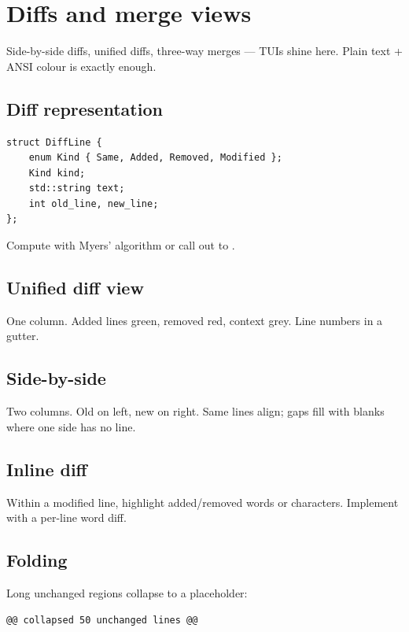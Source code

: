 \chapter{Diffs and merge views}
\label{ch:diffview}

\begin{aside}
Side-by-side diffs, unified diffs, three-way merges --- TUIs
shine here. Plain text + ANSI colour is exactly enough.
\end{aside}

\section{Diff representation}

\begin{lstlisting}
struct DiffLine {
    enum Kind { Same, Added, Removed, Modified };
    Kind kind;
    std::string text;
    int old_line, new_line;
};
\end{lstlisting}

Compute with Myers' algorithm or call out to .

\section{Unified diff view}

One column. Added lines green, removed red, context grey.
Line numbers in a gutter.

\section{Side-by-side}

Two columns. Old on left, new on right. Same lines align;
gaps fill with blanks where one side has no line.

\section{Inline diff}

Within a modified line, highlight added/removed words or
characters. Implement with a per-line word diff.

\section{Folding}

Long unchanged regions collapse to a placeholder:

\begin{lstlisting}
@@ collapsed 50 unchanged lines @@
\end{lstlisting}


